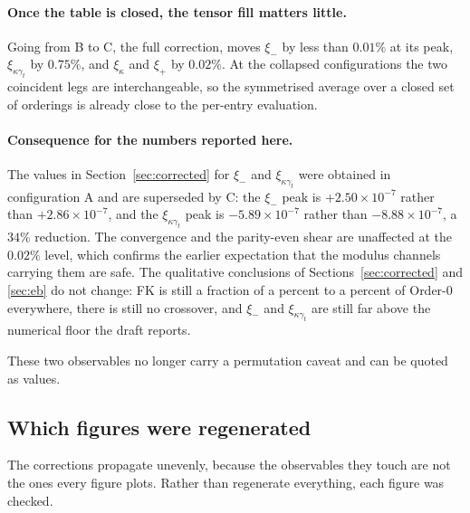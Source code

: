 \paragraph{Once the table is closed, the tensor fill matters little.}
Going from B to C, the full correction, moves $\xi_-$ by less than
$0.01\%$ at its peak, $\xi_{\kappa\gamma_t}$ by $0.75\%$, and
$\xi_\kappa$ and $\xi_+$ by $0.02\%$. At the collapsed configurations the
two coincident legs are interchangeable, so the symmetrised average over a
closed set of orderings is already close to the per-entry evaluation.

\paragraph{Consequence for the numbers reported here.} The values in
Section~\ref{sec:corrected} for $\xi_-$ and $\xi_{\kappa\gamma_t}$ were
obtained in configuration A and are superseded by C: the $\xi_-$ peak is
$+2.50\times10^{-7}$ rather than $+2.86\times10^{-7}$, and the
$\xi_{\kappa\gamma_t}$ peak is $-5.89\times10^{-7}$ rather than
$-8.88\times10^{-7}$, a $34\%$ reduction. The convergence and the
parity-even shear are unaffected at the $0.02\%$ level, which confirms the
earlier expectation that the modulus channels carrying them are safe. The
qualitative conclusions of Sections~\ref{sec:corrected} and \ref{sec:eb} do
not change: FK is still a fraction of a percent to a percent of Order-0
everywhere, there is still no crossover, and $\xi_-$ and
$\xi_{\kappa\gamma_t}$ are still far above the numerical floor the draft
reports.

These two observables no longer carry a permutation caveat and can be
quoted as values.

\subsection{Which figures were regenerated}

The corrections propagate unevenly, because the observables they touch are
not the ones every figure plots. Rather than regenerate everything, each
figure was checked.

